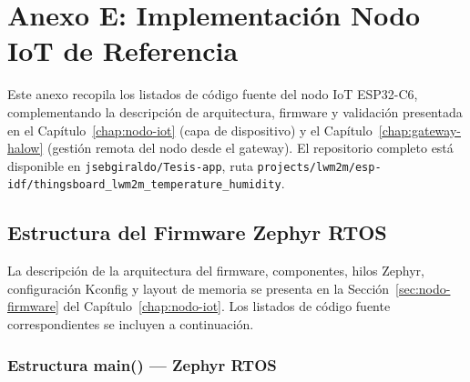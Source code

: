 ﻿\chapter{Anexo E: Implementación Nodo IoT de Referencia}
\label{anexo:nodo}

Este anexo recopila los listados de código fuente del nodo IoT ESP32-C6, complementando la descripción de arquitectura, firmware y validación presentada en el Capítulo~\ref{chap:nodo-iot} (capa de dispositivo) y el Capítulo~\ref{chap:gateway-halow} (gestión remota del nodo desde el gateway). El repositorio completo está disponible en \texttt{jsebgiraldo/Tesis-app}, ruta \texttt{projects/lwm2m/esp-idf/thingsboard\_lwm2m\_temperature\_humidity}.

\section{Estructura del Firmware Zephyr RTOS}
\label{sec:anexo-firmware-zephyr}

La descripción de la arquitectura del firmware, componentes, hilos Zephyr, configuración Kconfig y layout de memoria se presenta en la Sección~\ref{sec:nodo-firmware} del Capítulo~\ref{chap:nodo-iot}. Los listados de código fuente correspondientes se incluyen a continuación.

\subsection{Estructura main() --- Zephyr RTOS}

